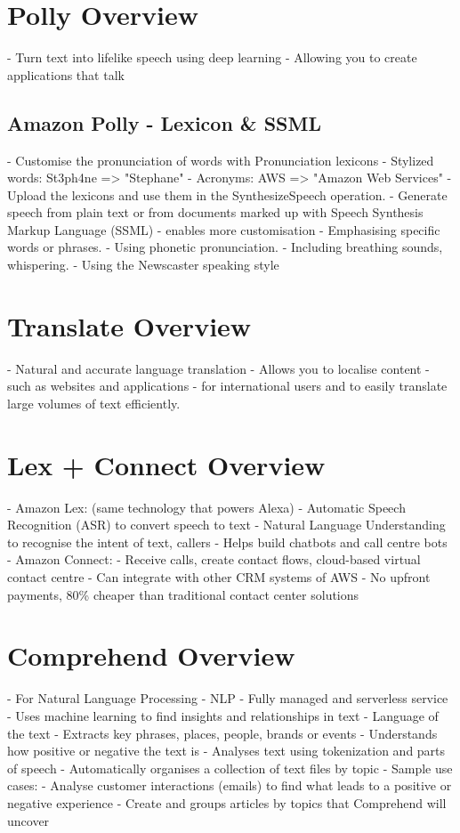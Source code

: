 \documentclass[11pt]{article}
\begin{document}
    \section{Polly Overview}
    - Turn text into lifelike speech using deep learning
    - Allowing you to create applications that talk

    \subsection{Amazon Polly - Lexicon \& SSML}
    - Customise the pronunciation of words with Pronunciation lexicons
        - Stylized words: St3ph4ne => "Stephane"
        - Acronyms: AWS => "Amazon Web Services"
    - Upload the lexicons and use them in the SynthesizeSpeech operation.
    - Generate speech from plain text or from documents marked up with Speech Synthesis Markup Language (SSML) - enables more customisation
        - Emphasising specific words or phrases.
        - Using phonetic pronunciation.
        - Including breathing sounds, whispering.
        - Using the Newscaster speaking style

    \section{Translate Overview}
    - Natural and accurate language translation
    - Allows you to localise content - such as websites and applications - for international users and to easily translate large volumes of text efficiently.

    \section{Lex + Connect Overview}
    - Amazon Lex: (same technology that powers Alexa)
        - Automatic Speech Recognition (ASR) to convert speech to text
        - Natural Language Understanding to recognise the intent of text, callers
        - Helps build chatbots and call centre bots
    - Amazon Connect:
        - Receive calls, create contact flows, cloud-based virtual contact centre
        - Can integrate with other CRM systems of AWS
        - No upfront payments, 80\% cheaper than traditional contact center solutions 🤔
    \section{Comprehend Overview}
    - For Natural Language Processing - NLP
    - Fully managed and serverless service
    - Uses machine learning to find insights and relationships in text
        - Language of the text
        - Extracts key phrases, places, people, brands or events
        - Understands how positive or negative the text is
        - Analyses text using tokenization and parts of speech
        - Automatically organises a collection of text files by topic
    - Sample use cases:
        - Analyse customer interactions (emails) to find what leads to a positive or negative experience
        - Create and groups articles by topics that Comprehend will uncover
\end{document}
